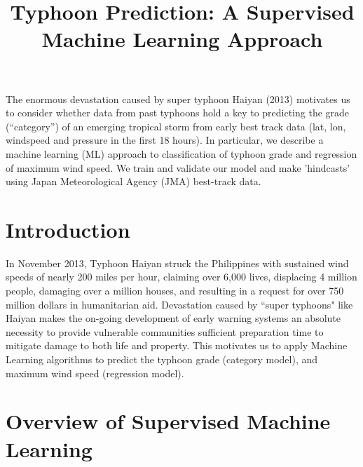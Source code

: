 \documentclass{SBCbookchapter}
\title{Typhoon Prediction: A Supervised Machine Learning Approach}
\begin{document}
\maketitle



\vspace{.3in}
\begin{minipage}[r]{4.25in}{\small
  The enormous devastation caused by super typhoon Haiyan (2013) motivates us to consider whether data from past typhoons hold a key to predicting the grade (``category'') of an emerging tropical storm from early best track data (lat, lon, windspeed and pressure in the first 18 hours). In particular, we describe a machine learning (ML) approach to classification of typhoon grade and regression of maximum wind speed. We train and validate our model and make 'hindcasts' using Japan Meteorological Agency (JMA) best-track data.}
\end{minipage}

\newpage

\section{Introduction}

  In November 2013, Typhoon Haiyan struck the Philippines with sustained wind speeds of nearly 200
miles per hour, claiming over 6,000 lives, displacing 4 million people, damaging over a million houses,
and resulting in a request for over 750 million dollars
in humanitarian aid. Devastation caused by
``super typhoons" like Haiyan makes the on-going
development of early warning systems an absolute
necessity to provide vulnerable communities sufficient preparation time to
mitigate damage to both life and property. This motivates us to apply Machine Learning algorithms to predict the typhoon grade (category model), and maximum wind speed (regression model).

\section{Overview of Supervised Machine Learning}
\end{document}
